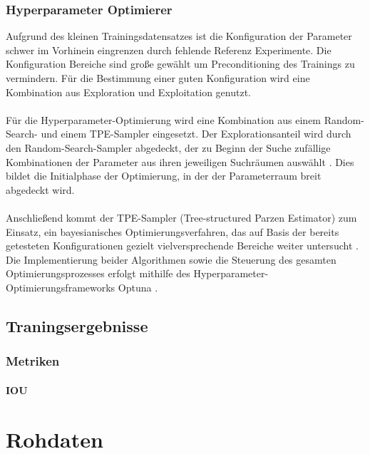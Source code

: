 \documentclass[12pt,DIV=15,BCOR=15mm,twoside,headsepline,abstract=true,listof=totoc,bibliography=totoc]{scrreprt}
\theoremstyle{remark}    %
\begin{document}
    \subsection{Hyperparameter Optimierer}
    Aufgrund des kleinen Trainingsdatensatzes ist die Konfiguration der Parameter schwer im Vorhinein eingrenzen durch fehlende Referenz Experimente.
    Die Konfiguration Bereiche sind große gewählt um Preconditioning des Trainings zu vermindern. Für die Bestimmung einer guten Konfiguration wird
    eine Kombination aus Exploration und Exploitation genutzt.\\\\
    Für die Hyperparameter-Optimierung wird eine Kombination aus einem Random-Search- und einem TPE-Sampler eingesetzt.
    Der Explorationsanteil wird durch den Random-Search-Sampler abgedeckt, der zu Beginn der Suche zufällige Kombinationen der Parameter aus ihren jeweiligen 
    Suchräumen auswählt \cite{akiba2019optunanextgenerationhyperparameteroptimization}. Dies bildet die Initialphase der Optimierung, in der der Parameterraum breit 
    abgedeckt wird. \\\\
    Anschließend kommt der TPE-Sampler (Tree-structured Parzen Estimator) zum Einsatz, ein bayesianisches Optimierungsverfahren, das auf Basis der bereits 
    getesteten Konfigurationen gezielt vielversprechende Bereiche weiter untersucht \cite{watanabe2023treestructuredparzenestimatorunderstanding}.
    Die Implementierung beider Algorithmen sowie die Steuerung des gesamten Optimierungsprozesses erfolgt mithilfe des Hyperparameter-Optimierungsframeworks 
    Optuna \cite{akiba2019optunanextgenerationhyperparameteroptimization}.

    \section{Traningsergebnisse}

    \subsection{Metriken}

    \subsubsection{IOU}

    \clearpage
    \appendix
    
    \chapter{Rohdaten}
\end{document}
